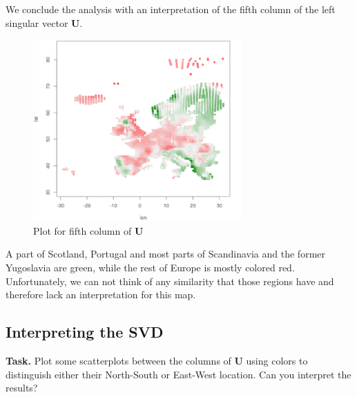 \documentclass{support/acm_proc_article-sp}
\begin{document}
    We conclude the analysis with an interpretation of the fifth column of the left singular vector $\mathbf{U}$.
    \begin{figure}[!htbp]
        \centering
        \includegraphics[width=8cm]{images/2c-5.png}
        \caption{Plot for fifth column of $\mathbf{U}$}
        \label{fig:2c-5}
    \end{figure}
    A part of Scotland, Portugal and most parts of Scandinavia and the former Yugoslavia are green, while the rest of
    Europe is mostly colored red.
    Unfortunately, we can not think of any similarity that those regions have and therefore lack an interpretation for
    this map.


    \subsection{Interpreting the SVD}

    \textbf{Task.} Plot some scatterplots between the columns of $\mathbf{U}$ using colors to distinguish either their
    North-South or East-West location.
    Can you interpret the results?
\end{document}
